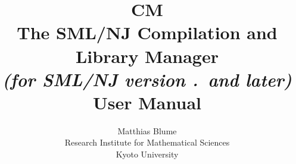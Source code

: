 \documentclass[titlepage,letterpaper]{article}
\author{Matthias Blume \\
Research Institute for Mathematical Sciences \\
Kyoto University}
\title{{\bf CM}\\
The SML/NJ Compilation and Library Manager \\
{\it\small (for SML/NJ version \smlmj.\smlmn~and later)} \\
User Manual}
\begin{document}


\maketitle

\pagebreak

\tableofcontents

\pagebreak


















\pagebreak

\appendix









\pagebreak


\end{document}
